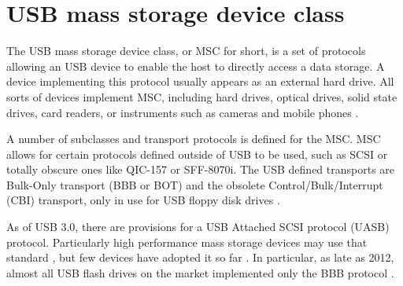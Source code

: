
    \section{USB mass storage device class}
        The USB mass storage device class, or MSC for short, is a set of protocols allowing an USB device to enable the host to directly access a data storage.  A device implementing this protocol usually appears as an external hard drive.  All sorts of devices implement MSC, including hard drives, optical drives, solid state drives, card readers, or instruments such as cameras and mobile phones \cite{usb-keil-msc}.
        
        A number of subclasses and transport protocols is defined for the MSC.  MSC allows for certain protocols defined outside of USB to be used, such as SCSI or totally obscure ones like QIC-157 or SFF-8070i.  The USB defined transports are Bulk-Only transport (BBB or BOT) and the obsolete Control/Bulk/Interrupt (CBI) transport, only in use for USB floppy disk drives \cite{usb-mass-storage} \cite{usb-mass-bulk}.
        
        As of USB 3.0, there are provisions for a USB Attached SCSI protocol (UASB) protocol.  Particularly high performance mass storage devices may use that standard \cite{usb-electronicdesign-usb-uasp-bot}, but few devices have adopted it so far \cite{usb-winaero-usb-scsi-uas}.  In particular, as late as 2012, almost all USB flash drives on the market implemented only the BBB protocol \cite{usb-qemu-usb-storage}.
        


